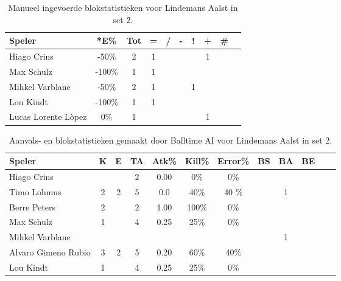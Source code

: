 \begin{table}[ht!]
    \centering
    \scriptsize
    \begin{tabular}{|l|c|c|c|c|c|c|c|c|c|}
        \hline
        \textbf{Speler} & *E\% & Tot & = & / & - & ! & + & \# \\ \hline
        Hiago Crins & -50\% & 2 & 1 &  &  &  & 1 &  \\
        Max Schulz & -100\% & 1 & 1 &  &  &  &  & \\
        Mihkel Varblane & -50\% & 2 & 1 &  &  & 1 &  & \\
        Lou Kindt & -100\% & 1 & 1 &  &  &  &  & \\
        Lucas Lorente Lòpez & 0\% & 1 &  &  &  &  & 1 & \\ \hline
    \end{tabular}
    \caption[Manueel ingevoerde blokstatistieken voor Lindemans Aalst in set 2]{\label{tab:PL3BlockAalstMan2}Manueel ingevoerde blokstatistieken voor Lindemans Aalst in set 2.}
\end{table}

\begin{table}[ht!]
  \centering
  \scriptsize
  \begin{tabular}{|l|c|c|c|c|c|c|c|c|c|c|c|} \hline
    \textbf{Speler} &  K & E & TA & Atk\% & Kill\% & Error\% & BS & BA & BE \\ \hline
    Hiago Crins &  &  & 2 & 0.00 & 0\% & 0\% &  &  &\\
    Timo Lohmus & 2 & 2 & 5 & 0.0 & 40\% & 40 \%&  & 1 & \\
    Berre Peters & 2 &  & 2 & 1.00 & 100\% & 0\% &   &  & \\
    Max Schulz & 1 &  & 4 & 0.25 & 25\% & 0\% &   &  & \\
    Mihkel Varblane &   &   &   &   &   &   &  & 1 &\\
    Alvaro Gimeno Rubio & 3 & 2 & 5 & 0.20 & 60\% & 40\% &   &  & \\
    Lou Kindt & 1 &  & 4 & 0.25 & 25\% & 0\% &   &  & \\ \hline
  \end{tabular}
  \caption[Aanvals- en blokstatistieken gemaakt door Balltime AI voor Lindemans Aalst in set 2]{\label{tab:PL3AttBlockAalstAI2}Aanvals- en blokstatistieken gemaakt door Balltime AI voor Lindemans Aalst in set 2.}
\end{table}
